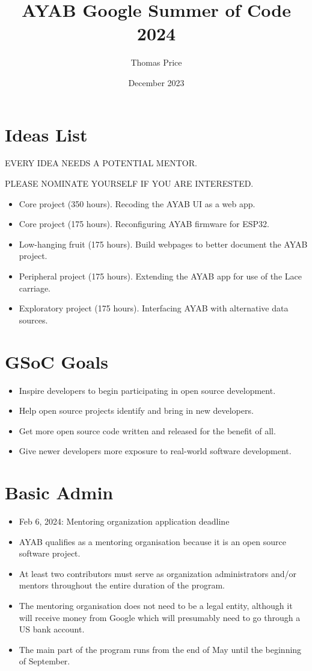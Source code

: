 \documentclass{article}
\title{AYAB Google Summer of Code 2024}
\author{Thomas Price}
\date{December 2023}
\begin{document}
\maketitle

\section{Ideas List}

EVERY IDEA NEEDS A POTENTIAL MENTOR.

PLEASE NOMINATE YOURSELF IF YOU ARE INTERESTED.

\begin{itemize}
\item Core project (350 hours). Recoding the AYAB UI as a web app.
\item Core project (175 hours). Reconfiguring AYAB firmware for ESP32.
\item Low-hanging fruit (175 hours). Build webpages to better document the AYAB project.
\item Peripheral project (175 hours). Extending the AYAB app for use of the Lace carriage.
\item Exploratory project (175 hours). Interfacing AYAB with alternative data sources.
\end{itemize}

\section{GSoC Goals}

\begin{itemize}
\item Inspire developers to begin participating in open source development.
\item Help open source projects identify and bring in new developers.
\item Get more open source code written and released for the benefit of all.
\item Give newer developers more exposure to real-world software development.
\end{itemize}

\section{Basic Admin}

\begin{itemize}
\item Feb 6, 2024: Mentoring organization application deadline
\item AYAB qualifies as a mentoring organisation because it is an open source software project.
\item At least two contributors must serve as organization administrators and/or mentors throughout the entire duration of the program.
\item The mentoring organisation does not need to be a legal entity, although it will receive money from Google which will presumably need to go through a US bank account.
\item The main part of the program runs from the end of May until the beginning of September.
\end{itemize}
\end{document}
